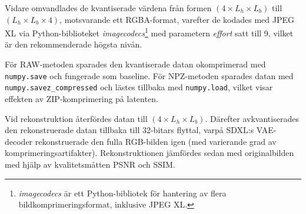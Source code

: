 Vidare omvandlades de kvantiserade värdena från formen
$(4 \times L_h \times L_b)$ till $(L_h \times L_b \times 4)$,
motsvarande ett RGBA-format, varefter de kodades med JPEG XL via Python-biblioteket
\textit{imagecodecs}\footnote{\textit{imagecodecs} är ett Python-bibliotek för hantering av flera bildkomprimeringsformat, inklusive JPEG XL.}
med parametern \textit{effort} satt till 9, vilket är den rekommenderade högsta nivån.

För RAW-metoden sparades den kvantiserade datan okomprimerad med
\texttt{numpy.save} och fungerade som baseline.
För NPZ-metoden sparades datan med
\texttt{numpy.savez\_compressed} och lästes tillbaka med \texttt{numpy.load},
vilket visar effekten av ZIP-komprimering på latenten.

Vid rekonstruktion återfördes datan till $(4 \times L_h \times L_b)$. Därefter avkvantiserades den rekonstruerade datan tillbaka
till 32-bitars flyttal, varpå SDXL:s VAE-decoder rekonstruerade
den fulla RGB-bilden igen (med varierande grad av komprimeringsartifakter).
Rekonstruktionen jämfördes sedan med originalbilden med hjälp av
kvalitetsmåtten PSNR och SSIM.

%
%

